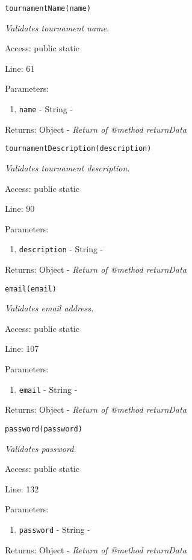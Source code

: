 \texttt{tournamentName(name)}

{\scriptsize
\textit{Validates tournament name.}

Access: public static

Line: 61

Parameters:

\begin{enumerate}
\item \texttt{name} - String - \textit{}
\end{enumerate}
Returns: Object - \textit{Return of @method returnData}

}

\texttt{tournamentDescription(description)}

{\scriptsize
\textit{Validates tournament description.}

Access: public static

Line: 90

Parameters:

\begin{enumerate}
\item \texttt{description} - String - \textit{}
\end{enumerate}
Returns: Object - \textit{Return of @method returnData}

}

\texttt{email(email)}

{\scriptsize
\textit{Validates email address.}

Access: public static

Line: 107

Parameters:

\begin{enumerate}
\item \texttt{email} - String - \textit{}
\end{enumerate}
Returns: Object - \textit{Return of @method returnData}

}

\texttt{password(password)}

{\scriptsize
\textit{Validates password.}

Access: public static

Line: 132

Parameters:

\begin{enumerate}
\item \texttt{password} - String - \textit{}
\end{enumerate}
Returns: Object - \textit{Return of @method returnData}

}

